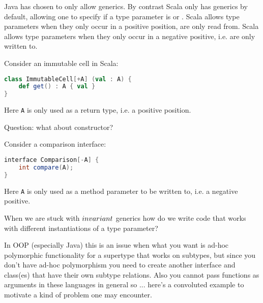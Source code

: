 \documentclass{article}
\begin{document}
Java has chosen to only allow \textit{\invar{}} generics.
By contrast Scala only has \invar{} generics by default, allowing one to specify if a type parameter is \covar{} or \contra{}. Scala allows \contra{} type parameters when they only occur in a positive position, are only read from.
Scala allows \contra{} type parameters when they only occur in a negative positive, i.e. are only written to.

\begin{example}
Consider an immutable cell in Scala:
\begin{lstlisting}[language=Scala]
class ImmutableCell[+A] (val : A) {
    def get() : A { val }
}
\end{lstlisting}
Here \texttt{A} is only used as a return type, i.e. a positive position.

Question: what about constructor?
\end{example}

\begin{example}
Consider a comparison interface:
\begin{lstlisting}[language=Scala]
interface Comparison[-A] {
    int compare(A);
}
\end{lstlisting}
Here \texttt{A} is only used as a method parameter to be written to, i.e. a negative positive.
\end{example}

When we are stuck with $invariant{}$ generics how do we write code that works with different instantiations of a type parameter?

In OOP (especially Java) this is an issue when what you want is ad-hoc polymorphic functionality for a supertype that works on subtypes, but since you don't have ad-hoc polymorphism you need to create another interface and class(es) that have their own subtype relations. Also you cannot pass functions as arguments in these languages in general so ... here's a convoluted example to motivate a kind of problem one may encounter.
\end{document}

